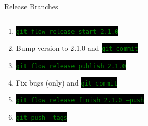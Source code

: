 \documentclass[
14pt,
aspectratio=169,
usenames,
dvipsnames,
x11names]{beamer}
\newcommand{\code}[1]{{\small\setlength{\fboxsep}{2pt}\colorbox{black}{\textcolor{green}{\texttt{#1}}}}}
\newcommand{\shadowbox}[2]{%
  \hbox{%
    \begin{tcolorbox}[beamer,
      width=#1,
      drop fuzzy shadow=black,
      arc=0pt,
      boxsep=0pt,
      left=0pt,right=0pt,top=0pt,bottom=0pt,
      ]%
      #2
    \end{tcolorbox}
  }
}
\begin{document}
\begin{frame}{Release Branches}
  \begin{columns}
    \begin{column}{.65\linewidth}
      \minipage[c][0.75\textheight][s]{\columnwidth}
      \begin{enumerate} \setlength{\itemsep}{\fill}
      \item \code{git flow release start 2.1.0}
      \item Bump version to 2.1.0 and \code{git commit}
      \item \code{git flow release publish 2.1.0}
      \item Fix bugs (only) and \code{git commit}
      \item \code{git flow release finish 2.1.0 --push}
      \item \code{git push --tags}
      \end{enumerate}
      \endminipage
    \end{column}
  \end{columns}
\end{frame}
\end{document}
